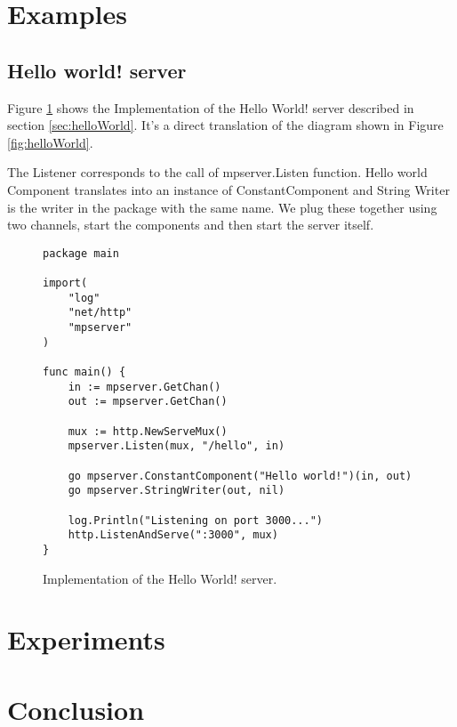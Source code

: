 \documentclass[12pt,a4paper]{article}
\begin{document}
\newpage
\section{Examples}
\label{sec:examples}
\subsection{Hello world! server}
Figure \ref{fig:HelloWorldImpl} shows the Implementation of the Hello World!
server described in section \ref{sec:helloWorld}.
It's a direct translation of the diagram shown in Figure \ref{fig:helloWorld}.

The Listener corresponds to the call of mpserver.Listen function.
Hello world Component translates into an instance of ConstantComponent
and String Writer is the writer in the package with the same name.
We plug these together using two channels, start the components 
and then start the server itself.

\begin{figure}[h]
\centering
\begin{lstlisting}
package main

import(
    "log"
    "net/http"
    "mpserver"
)

func main() {
    in := mpserver.GetChan()
    out := mpserver.GetChan()

    mux := http.NewServeMux()
    mpserver.Listen(mux, "/hello", in)

    go mpserver.ConstantComponent("Hello world!")(in, out)
    go mpserver.StringWriter(out, nil)
    
    log.Println("Listening on port 3000...")
    http.ListenAndServe(":3000", mux)
}
\end{lstlisting}
\caption[scale=1.0]{Implementation of the Hello World! server.}
\label{fig:HelloWorldImpl}
\end{figure}

\newpage
\section{Experiments}
\label{sec:test}
\newpage
\section{Conclusion}
\label{sec:conclusion}

\newpage
\printbibliography[
    heading=bibintoc,
    title={References}
]
\end{document}
